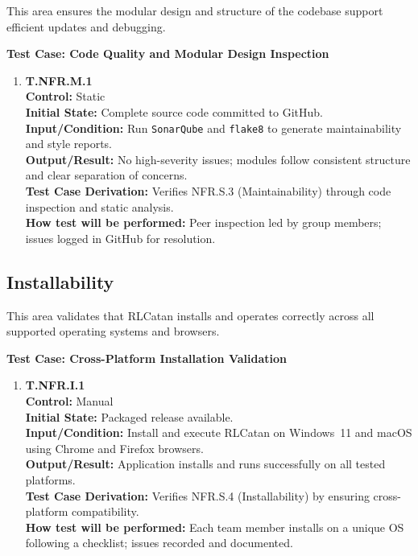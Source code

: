 \documentclass[12pt, titlepage]{article}
\begin{document}
This area ensures the modular design and structure of the codebase support efficient updates and debugging.

\textbf{Test Case: Code Quality and Modular Design Inspection}

\begin{enumerate}
\item \textbf{T.NFR.M.1} \\
\textbf{Control:} Static \\
\textbf{Initial State:} Complete source code committed to GitHub. \\
\textbf{Input/Condition:} Run \texttt{SonarQube} and \texttt{flake8} to generate maintainability and style reports. \\
\textbf{Output/Result:} No high-severity issues; modules follow consistent structure and clear separation of concerns. \\
\textbf{Test Case Derivation:} Verifies NFR.S.3 (Maintainability) through code inspection and static analysis. \\
\textbf{How test will be performed:} Peer inspection led by group members; issues logged in GitHub for resolution.
\end{enumerate}

\subsection{Installability}

This area validates that RLCatan installs and operates correctly across all supported operating systems and browsers.

\textbf{Test Case: Cross-Platform Installation Validation}

\begin{enumerate}
\item \textbf{T.NFR.I.1} \\
\textbf{Control:} Manual \\
\textbf{Initial State:} Packaged release available. \\
\textbf{Input/Condition:} Install and execute RLCatan on Windows~11 and macOS using Chrome and Firefox browsers. \\
\textbf{Output/Result:} Application installs and runs successfully on all tested platforms. \\
\textbf{Test Case Derivation:} Verifies NFR.S.4 (Installability) by ensuring cross-platform compatibility. \\
\textbf{How test will be performed:} Each team member installs on a unique OS following a checklist; issues recorded and documented.
\end{enumerate}
\end{document}
